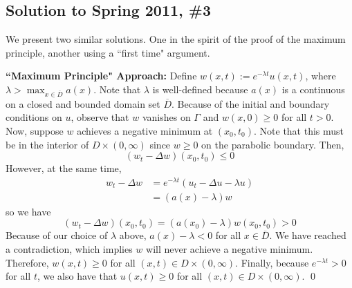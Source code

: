 \subsection*{Solution to Spring 2011, \#3}\label{s113}
We present two similar solutions. One in the spirit of the proof of the maximum principle, another using a ``first time" argument.

\vspace{0.25in}

\noindent \textbf{``Maximum Principle" Approach:} Define $w(x,t) := e^{-\lambda t} u(x,t)$, where $\lambda > \max_{x \in \overline{D}} a(x)$. Note that $\lambda$ is well-defined because $a(x)$ is a continuous on a closed and bounded domain set $\overline{D}$.  Because of the initial and boundary conditions on $u$, observe that $w$ vanishes on $\Gamma$ and $w(x,0) \geq 0$ for all $t>0$. Now, suppose $w$ achieves a negative minimum at $(x_0,t_0)$. Note that this must be in the interior of $D \times (0,\infty)$ since $w \geq 0$ on the parabolic boundary. Then,
$$ (w_t - \Delta w)(x_0,t_0) \leq 0$$
However, at the same time,
\begin{align*}
	w_t - \Delta w &= e^{-\lambda t} (u_t - \Delta u - \lambda u) \\
	&= (a(x) - \lambda) w
\end{align*}
so we have
$$ (w_t - \Delta w)(x_0,t_0) = (a(x_0) - \lambda) w(x_0,t_0) > 0 $$
Because of our choice of $\lambda$ above, $a(x) - \lambda < 0$ for all $x \in \overline{D}$. We have reached a contradiction, which implies $w$ will never achieve a negative minimum. Therefore, $w(x,t) \geq 0$ for all $(x,t) \in D \times (0,\infty)$. Finally, because $e^{-\lambda t} > 0$ for all $t$, we also have that $u(x,t) \geq 0$ for all $(x,t) \in D \times (0,\infty)$. \qed

\vspace{0.25in}

